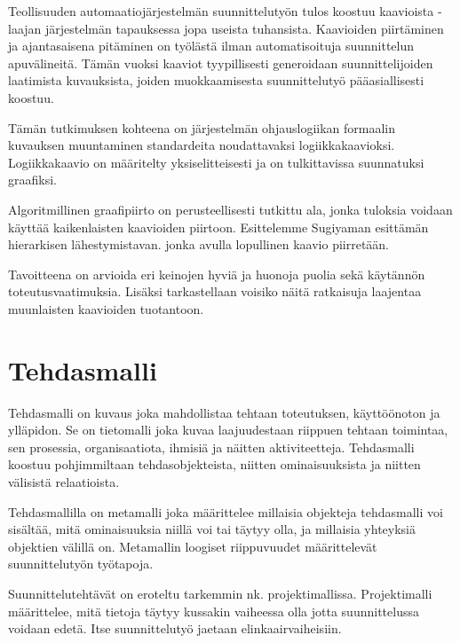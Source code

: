 \documentclass[finnish,12pt]{article}
\begin{document}
Teollisuuden automaatiojärjestelmän suunnittelutyön tulos koostuu kaavioista - laajan järjestelmän tapauksessa jopa useista tuhansista. 
Kaavioiden piirtäminen ja ajantasaisena pitäminen on työlästä ilman automatisoituja suunnittelun apuvälineitä.
Tämän vuoksi kaaviot tyypillisesti generoidaan suunnittelijoiden laatimista kuvauksista, joiden muokkaamisesta suunnittelutyö pääasiallisesti koostuu.

Tämän tutkimuksen kohteena on järjestelmän ohjauslogiikan formaalin kuvauksen muuntaminen standardeita noudattavaksi logiikkakaavioksi.
Logiikkakaavio on määritelty yksiselitteisesti ja on tulkittavissa suunnatuksi graafiksi.


Algoritmillinen graafipiirto on perusteellisesti tutkittu ala, jonka tuloksia voidaan käyttää kaikenlaisten kaavioiden piirtoon.
Esittelemme Sugiyaman esittämän hierarkisen lähestymistavan. jonka avulla lopullinen kaavio piirretään.

Tavoitteena on arvioida eri keinojen hyviä ja huonoja puolia sekä käytännön toteutusvaatimuksia.
Lisäksi tarkastellaan voisiko näitä ratkaisuja laajentaa muunlaisten kaavioiden tuotantoon.

	\clearpage
	\section{Tehdasmalli}

Tehdasmalli on kuvaus joka mahdollistaa tehtaan toteutuksen, käyttöönoton ja ylläpidon.
Se on tietomalli joka kuvaa laajuudestaan riippuen tehtaan toimintaa, sen prosessia, organisaatiota, ihmisiä ja näitten aktiviteetteja.
Tehdasmalli koostuu pohjimmiltaan tehdasobjekteista, niitten ominaisuuksista ja niitten välisistä relaatioista.

Tehdasmallilla on metamalli joka määrittelee millaisia objekteja tehdasmalli voi sisältää, mitä ominaisuuksia niillä voi tai täytyy olla, ja millaisia yhteyksiä objektien välillä on.
Metamallin loogiset riippuvuudet määrittelevät suunnittelutyön työtapoja.

Suunnittelutehtävät on eroteltu tarkemmin nk. projektimallissa.
Projektimalli määrittelee, mitä tietoja täytyy kussakin vaiheessa olla jotta suunnittelussa voidaan edetä.
Itse suunnittelutyö jaetaan elinkaairvaiheisiin.
\end{document}

